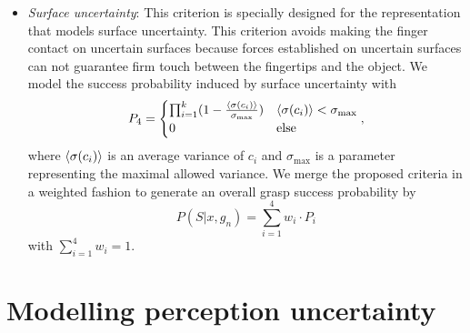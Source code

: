 \begin{itemize}
\item \textit{Surface uncertainty}:
 This criterion is specially designed for the representation that models surface uncertainty. This criterion avoids making the finger contact on uncertain surfaces because forces established on uncertain surfaces can not guarantee firm touch between the fingertips and the object. We model the success probability induced by surface uncertainty with 
\begin{equation}
 P_4 =  \begin{cases}
\prod_{i=1}^{k}(1 -\frac{\left< \sigma(c_i) \right>}{\sigma_{\text{max}} }   )  &  \left< \sigma(c_i) \right> < \sigma_{\text{max}}\\
  0   & \text{else}
\end{cases},
\end{equation} 
where $\left< \sigma(c_i) \right> $ is an average variance of $c_i$ and $\sigma_{\text{max}}$ is a parameter representing the maximal allowed variance. We merge the proposed  criteria in a weighted fashion to generate an overall grasp success probability by  
\begin{equation}
P(S | x , g_n) =  \sum_{i=1}^4 w_i \cdot P_i 
\label{equ:weights}
\end{equation} 
with $\sum_{i=1}^4 w_i  = 1$.
\end{itemize}


\section{Modelling perception uncertainty}




